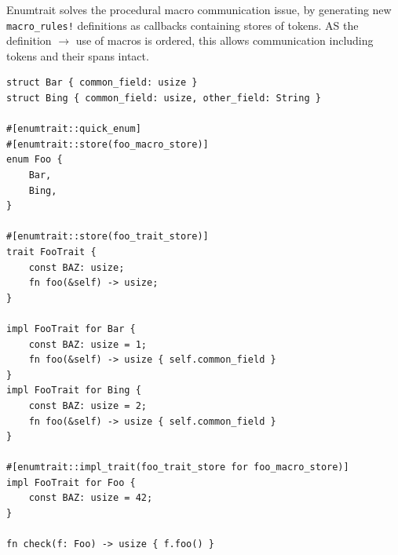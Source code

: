 Enumtrait solves the procedural macro communication issue, by generating new \texttt{macro_rules!} definitions
as callbacks containing stores of tokens. AS the definition $\to$ use of macros is ordered, this allows communication including tokens and their spans intact.

\begin{verbatim}
struct Bar { common_field: usize }
struct Bing { common_field: usize, other_field: String }

#[enumtrait::quick_enum]
#[enumtrait::store(foo_macro_store)]
enum Foo {
    Bar,
    Bing,
}

#[enumtrait::store(foo_trait_store)]
trait FooTrait {
    const BAZ: usize;
    fn foo(&self) -> usize;
}

impl FooTrait for Bar {  
    const BAZ: usize = 1;
    fn foo(&self) -> usize { self.common_field }
}
impl FooTrait for Bing { 
    const BAZ: usize = 2; 
    fn foo(&self) -> usize { self.common_field }
}

#[enumtrait::impl_trait(foo_trait_store for foo_macro_store)]
impl FooTrait for Foo {
    const BAZ: usize = 42;
}

fn check(f: Foo) -> usize { f.foo() }
\end{verbatim}

